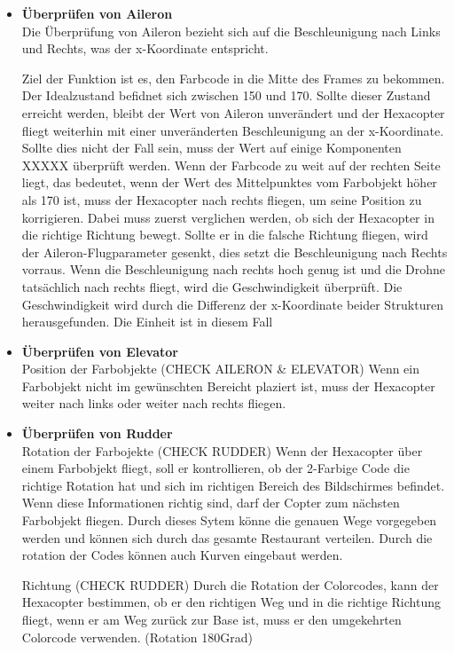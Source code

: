       \begin{itemize}
        \item \textbf{Überprüfen von Aileron}\\
        Die Überprüfung von Aileron bezieht sich auf die Beschleunigung nach Links und Rechts, was der x-Koordinate entspricht.

        Ziel der Funktion ist es, den Farbcode in die Mitte des Frames zu bekommen. Der Idealzustand befidnet sich zwischen 150 und 170.
        Sollte dieser Zustand erreicht werden, bleibt der Wert von Aileron unverändert und der Hexacopter fliegt weiterhin mit einer unveränderten Beschleunigung an der
        x-Koordinate.
        Sollte dies nicht der Fall sein, muss der Wert auf einige Komponenten XXXXX überprüft werden.
        Wenn der Farbcode zu weit auf der rechten Seite liegt, das bedeutet, wenn der Wert des Mittelpunktes vom Farbobjekt höher als 170 ist,
        muss der Hexacopter nach rechts fliegen, um seine Position zu korrigieren.
        Dabei muss zuerst verglichen werden, ob sich der Hexacopter in die richtige Richtung bewegt. Sollte er in die falsche Richtung
        fliegen, wird der Aileron-Flugparameter gesenkt, dies setzt die Beschleunigung nach Rechts vorraus.
        Wenn die Beschleunigung nach rechts hoch genug ist und die Drohne tatsächlich nach rechts fliegt, wird die Geschwindigkeit überprüft.
        Die Geschwindigkeit wird durch die Differenz der x-Koordinate beider Strukturen herausgefunden. Die Einheit ist in diesem Fall



        \item \textbf{Überprüfen von Elevator}\\
        Position der Farbobjekte (CHECK AILERON \& ELEVATOR)
        Wenn ein Farbobjekt nicht im gewünschten Bereicht plaziert ist, muss der Hexacopter weiter nach links oder weiter nach rechts fliegen.
        \item \textbf{Überprüfen von Rudder}\\
        Rotation der Farbojekte (CHECK RUDDER)
        Wenn der Hexacopter über einem Farbobjekt fliegt, soll er kontrollieren, ob der 2-Farbige Code die richtige Rotation hat und sich im richtigen Bereich des Bildschirmes befindet. Wenn diese Informationen richtig sind, darf der Copter zum nächsten Farbobjekt fliegen.
        Durch dieses Sytem könne die genauen Wege vorgegeben werden und können sich durch das gesamte Restaurant verteilen. Durch die rotation der Codes können auch Kurven eingebaut werden.

        Richtung (CHECK RUDDER)
        Durch die Rotation der Colorcodes, kann der Hexacopter bestimmen, ob er den richtigen Weg und in die richtige Richtung fliegt, wenn er am Weg zurück zur Base ist, muss er den umgekehrten Colorcode verwenden. (Rotation 180Grad)
      \end{itemize}


